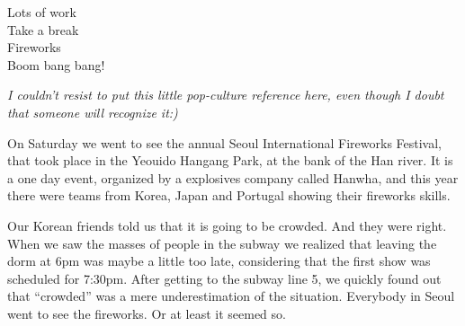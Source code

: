 \begin{post}
	\begin{content}
\begin{blockquote}Lots of work\\
Take a break\\
Fireworks\\
Boom bang bang!
\end{blockquote}

\textit{I couldn't resist to put this little pop-culture reference here, even though I doubt that someone will recognize it:)}

On Saturday we went to see the annual Seoul International Fireworks Festival, that took place in the Yeouido Hangang Park, at the bank of the Han river. It is a one day event, organized by a explosives company called Hanwha, and this year there were teams from Korea, Japan and Portugal showing their fireworks skills.

Our Korean friends told us that it is going to be crowded. And they were right. When we saw the masses of people in the subway we realized that leaving the dorm at 6pm was maybe a little too late, considering that the first show was scheduled for 7:30pm. After getting to the subway line 5, we quickly found out that ``crowded'' was a mere underestimation of the situation. Everybody in Seoul went to see the fireworks. Or at least it seemed so.

\begin{figure}[h]
\centering
{}
\end{figure}


\end{content}
\end{post}
